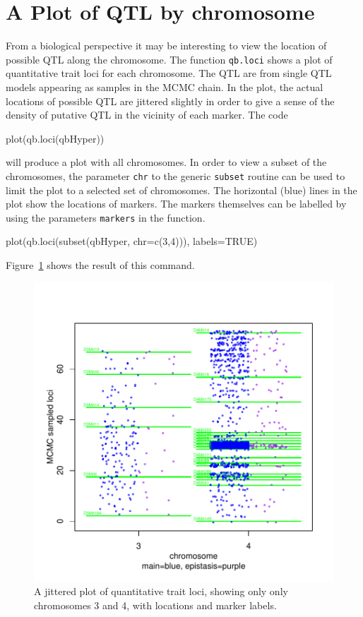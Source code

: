 \documentclass{article}
\begin{document}
\section{A Plot of QTL by chromosome}
From a biological perspective it may be interesting to view the location of possible QTL along 
the chromosome.  The function \texttt{qb.loci} shows a plot of quantitative 
trait loci for each chromosome.  The QTL are from single QTL models appearing as samples in the 
MCMC chain.  In the plot, the actual locations of possible QTL are jittered slightly in 
order to give a sense of the density of putative QTL in the vicinity of  each marker.  
The code
\begin{Schunk}
\begin{Sinput}
plot(qb.loci(qbHyper))
\end{Sinput}
\end{Schunk}
will produce a plot with all chromosomes. In order to view a subset of the 
chromosomes, the parameter \texttt{chr} to the generic \texttt{subset} routine can be used to limit the plot to a selected set 
of chromosomes.  The 
horizontal (blue) lines in the plot show the locations of markers.  
The markers themselves can be labelled by using the parameters 
\texttt{markers} in the function.
\begin{Schunk}
\begin{Sinput}
plot(qb.loci(subset(qbHyper, chr=c(3,4))), labels=TRUE)
\end{Sinput}
\end{Schunk} 
Figure~\ref{figPlotQBLOCI34} shows the result of this command.


\begin{figure}
\includegraphics{qtlbimPDF/FIG-QBLOCI34}
\caption{A jittered plot of quantitative trait loci, showing only only chromosomes 3 and 4, with locations and marker labels.}
\label{figPlotQBLOCI34}
\end{figure}
\end{document}
